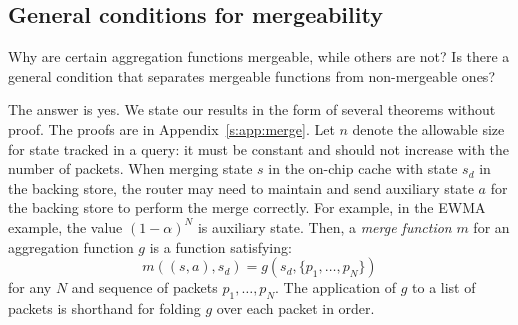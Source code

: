 \subsection{General conditions for mergeability}

Why are certain aggregation functions mergeable, while others are not? Is there
a general condition that separates mergeable functions from non-mergeable ones?

The answer is yes.
We state our results in the form of several theorems without proof. The proofs
are in Appendix~\ref{s:app:merge}.
Let $n$ denote the allowable size for state tracked in a \TheSystem query: it must be constant
and should not increase with the number of packets.
When merging state $s$ in the on-chip cache with state $s_d$ in the
backing store, the router may
need to maintain and send auxiliary state $a$ for the backing store to perform
the merge correctly. For example, in the EWMA example, the value $(1-\alpha)^N$
is auxiliary state. Then, a \emph{merge function} $m$ for an aggregation
function $g$ is a function
satisfying:
\[ m((s, a), s_d) = g(s_d, \{p_1, \ldots, p_N\}) \]
for any $N$ and sequence of packets $p_1, \ldots, p_N$. The application of $g$ to
a list of packets is shorthand for folding $g$ over each packet in order.

